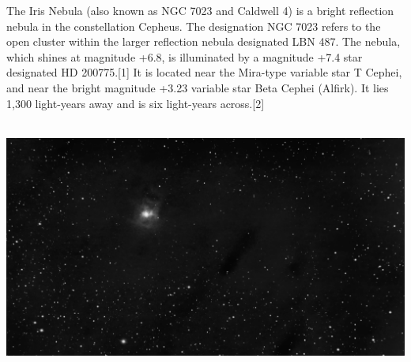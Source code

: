 {\footnotesize\color{white}
The Iris Nebula (also known as NGC 7023 and Caldwell 4) is a bright reflection nebula in the constellation Cepheus. The designation NGC 7023 refers to the open cluster within the larger reflection nebula designated LBN 487. The nebula, which shines at magnitude +6.8, is illuminated by a magnitude +7.4 star designated HD 200775.[1] It is located near the Mira-type variable star T Cephei, and near the bright magnitude +3.23 variable star Beta Cephei (Alfirk). It lies 1,300 light-years away and is six light-years across.[2]




}\ \\
\includegraphics[width=\textwidth]{../Imaging//Grayscale/Iris_Nebula.jpg}

